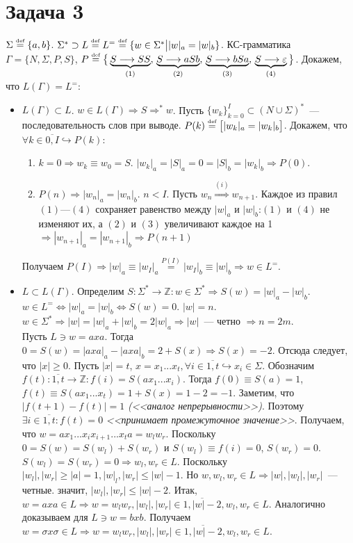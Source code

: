 \documentclass[a4paper]{article}
\def\eqdef{\overset{\mbox{\tiny def}}{=}}
\begin{document}
{\section*{Задача 3}
$\Sigma\eqdef\{a,b\}$. $\Sigma^*\supset L\eqdef L^=\eqdef\{w\in\Sigma^*\big||w|_a=|w|_b\}$. КС-грамматика $\Gamma=\{N,\Sigma,P,S\}$,\newline
$P\eqdef\big\{\underbrace{S\longrightarrow SS}_{(1)},\,\underbrace{S\longrightarrow aSb}_{(2)},\,\underbrace{S\longrightarrow bSa}_{(3)},\,\underbrace{S\longrightarrow \varepsilon}_{(4)}\big\}$.\newline
Докажем, что $L(\Gamma)=L^=$:\begin{itemize}
\item $L(\Gamma)\subset L$. $w\in L(\Gamma)\Rightarrow S\Longrightarrow^* w$. Пусть $\{w_k\}_{k=0}^I\subset (N\cup \Sigma)^*$~--- последовательность слов при выводе.\newline
$P(k)\eqdef\big[|w_k|_a=|w_k|_b\big]$. Докажем, что $\forall k\in\overline{0,I}\hookrightarrow P(k)$:\begin{enumerate}[1.]
\item $k=0\Rightarrow w_k\equiv w_0=S$. $|w_k|_a=|S|_a=0=|S|_b=|w_k|_b\Rightarrow P(0)$.
\item $P(n)\Rightarrow |w_n|_a=|w_n|_b$. $n<I$. Пусть $w_n\overset{(i)}{\Longrightarrow}w_{n+1}$. Каждое из правил $(1)$---$(4)$ сохраняет равенство между $|w|_a$ и $|w|_b$:\newline$(1)$ и $(4)$ не изменяют их, а $(2)$ и $(3)$ увеличивают каждое на 1 $\Rightarrow |w_{n+1}|_a=|w_{n+1}|_b\Rightarrow P(n+1)$
\end{enumerate}
Получаем $P(I)\Rightarrow |w|_a\equiv|w_I|_a\overset{P(I)}{=}|w_I|_b\equiv|w|_b\Rightarrow w\in L^=$.
\item $L\subset L(\Gamma)$.\newline
Определим $S\colon \Sigma^*\longrightarrow {\mathbb Z}\colon w\in\Sigma^*\Rightarrow S(w)=|w|_a-|w|_b$.
$w\in L^=\Leftrightarrow |w|_a=|w|_b\Leftrightarrow S(w)=0$. $|w|=n$. $w\in\Sigma^*\Rightarrow|w|=|w|_a+|w|_b=2|w|_a\Rightarrow |w|$~--- четно $\Rightarrow n=2m$.
\\[5pt]
Пусть $L\ni w=axa$. Тогда $0=S(w)=|axa|_a-|axa|_b=2+S(x)\Rightarrow S(x)=-2$. Отсюда следует, что $|x|\geqslant 0$. Пусть $|x|=t$, $x=x_1...x_t,\forall i\in\overline{1,t}\hookrightarrow x_i\in\Sigma$. Обозначим $f(t)\colon \overline{1,t}\longrightarrow {\mathbb Z}\colon f(i)=S(ax_1...x_i)$. Тогда $f(0)\equiv S(a)=1$, $f(t)\equiv S(ax_1...x_t)=1+S(x)=1-2=-1$. Заметим, что $|f(t+1)-f(t)|=1$ {\em (<<аналог непрерывности>>)}. Поэтому $\exists i\in\overline{1,t}\colon f(t)=0$ {\em <<принимает промежуточное значение>>}. Получаем, что $w=ax_1...x_ix_{i+1}...x_ta=w_lw_r$. Поскольку $0=S(w)=S(w_l)+S(w_r)$ и $S(w_l)\equiv f(i)=0$, $S(w_r)=0$. $S(w_l)=S(w_r)=0\Rightarrow w_l,w_r\in L$. Поскольку $|w_l|,|w_r|\geqslant |a|=1, |w|_l,|w_r|\leqslant |w|-1$. Но $w,w_l,w_r\in L\Rightarrow |w|,|w_l|,|w_r|$~--- четные. значит, $|w_l|,|w_r|\leqslant |w|-2$. Итак, $w=axa\in L\Rightarrow w=w_lw_r, |w_l|, |w_r|\in\overline{1, |w|-2}, w_l,w_r\in L$. Аналогично доказываем для $L\ni w=bxb$. Получаем $\boxed{w=\sigma x\sigma\in L\Rightarrow w=w_lw_r, |w_l|, |w_r|\in\overline{1, |w|-2}, w_l,w_r\in L}$.

\end{itemize}}
\end{document}
